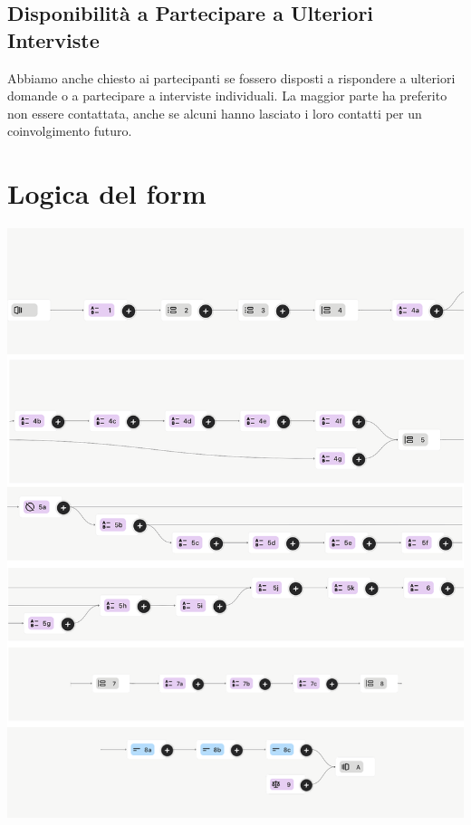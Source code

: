 \documentclass{article}
\begin{document}
\subsection{Disponibilità a Partecipare a Ulteriori Interviste}

Abbiamo anche chiesto ai partecipanti se fossero disposti a rispondere a ulteriori domande o a partecipare a interviste individuali. La maggior parte ha preferito non essere contattata, anche se alcuni hanno lasciato i loro contatti per un coinvolgimento futuro.

\section{Logica del form}

\vspace*{\fill}
\begin{center}
    \includegraphics[width=\textwidth]{form_logic.png} %
\end{center}
\vspace*{\fill}
\end{document}
